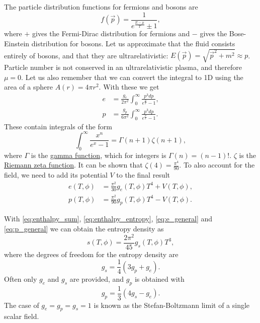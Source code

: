 The particle distribution functions for fermions and bosons are
\cite[eq. 4.6]{lecture_notes}
\begin{equation}
f(\vec{p}) = \frac{1}{e^\frac{E-\mu}{T} \pm 1},
\end{equation}
where $+$ gives the Fermi-Dirac distribution for fermions and $-$ gives the Bose-Einstein distribution for bosons.
Let us approximate that the fluid consists entirely of bosons,
and that they are ultrarelativistic: $E(\vec{p}) = \sqrt{\vec{p}^2 + m^2} \approx p$.
Particle number is not conserved in an ultrarelativistic plasma, and therefore $\mu = 0$.
Let us also remember that we can convert the integral to 1D using the area of a sphere $A(r) = 4\pi r^2$.
With these we get
\begin{align}
e &= \frac{g_e}{2 \pi^2} \int_0^\infty \frac{p^3 dp}{e^\frac{p}{T} - 1}, \\
p &= \frac{g_p}{6 \pi^2} \int_0^\infty \frac{p^3 dp}{e^\frac{p}{T} - 1}.
\end{align}
These contain integrals of the form
\cite[eq. B.36]{schroeder_thermal_2000}
\begin{equation}
\int_0^\infty \frac{x^n}{e^x - 1} = \Gamma(n+1) \zeta(n+1),
\end{equation}
where $\Gamma$ is the
\href{https://en.wikipedia.org/wiki/Gamma_function}{gamma function}, which for integers is $\Gamma(n) = (n-1)!$.
$\zeta$ is the
\href{https://en.wikipedia.org/wiki/Riemann_zeta_function}{Riemann zeta function}.
It can be shown that $\zeta(4) = \frac{\pi^4}{90}$.
\cite[prob. B.19]{schroeder_thermal_2000}
To also account for the field, we need to add its potential $V$ to the final result
\cite[eq. S12]{borsanyi_lattice_2016}
\begin{align}
e(T,\phi) &= \frac{\pi^2}{30} g_e(T,\phi) T^4 + V(T,\phi),
\label{eq:e_general} \\
p(T,\phi) &= \frac{\pi^2}{90} g_p(T,\phi) T^4 - V(T,\phi).
\label{eq:p_general}
\end{align}

With \eqref{eq:enthalpy_sum}, \eqref{eq:enthalpy_entropy}, \eqref{eq:e_general} and \eqref{eq:p_general} we can obtain the entropy density as
\cite[eq. S12]{borsanyi_lattice_2016}
\begin{equation}
s(T,\phi) = \frac{2\pi^2}{45} g_s(T,\phi) T^3,
\end{equation}
where the degrees of freedom for the entropy density are
\begin{equation}
g_s = \frac{1}{4} (3g_p + g_e).
\end{equation}
Often only $g_e$ and $g_s$ are provided, and $g_p$ is obtained with
\begin{equation}
g_p = \frac{1}{3}(4g_s - g_e).
\end{equation}
The case of $g_e=g_p=g_s=1$ is known as the Stefan-Boltzmann limit of a single scalar field.
\iffalse
due to its reminiscence to the Stefan-Boltzmann law $j^* = \sigma T^4$,
which relates the power radiated by a black body to its temperature with the Stefan-Boltzmann constant $\sigma$.
\fi


